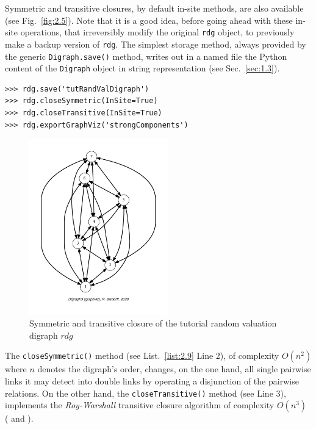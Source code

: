 Symmetric and transitive closures, by default in-site methods, are also available (see Fig.~\vref{fig:2.5}). Note that it is a good idea, before going ahead with these in-site operations, that irreversibly modify the original \texttt{rdg} object, to previously make a backup version of \texttt{rdg}. The simplest storage method, always provided by the generic \texttt{Digraph.save()} method, writes out in a named file the Python content of the \texttt{Digraph} object in string representation (see Sec.~\vref{sec:1.3}).
\begin{lstlisting}[caption={Symmeric and transitive closures},label=list:2.9]
>>> rdg.save('tutRandValDigraph')
>>> rdg.closeSymmetric(InSite=True)
>>> rdg.closeTransitive(InSite=True)
>>> rdg.exportGraphViz('strongComponents')
\end{lstlisting}
\begin{figure}[h]
\sidecaption[t]
\includegraphics[width=6cm]{Figures/2-5-strongComponents.pdf}
\caption{Symmetric and transitive closure of the tutorial random valuation digraph $rdg$}
\label{fig:2.5}       %
\end{figure}

The \texttt{closeSymmetric()} method (see List.~\vref{list:2.9} Line 2), of complexity $O(n^2)$ where $n$ denotes the digraph's order, changes, on the one hand, all single pairwise links it may detect into double links by operating a disjunction of the pairwise relations. On the other hand, the \texttt{closeTransitive()}  method (see Line 3), implements the \emph{Roy-Warshall} transitive closure algorithm of complexity $O(n^3)$   (\citealp{ROY-1959} and \citealp{WAR-1962}).

